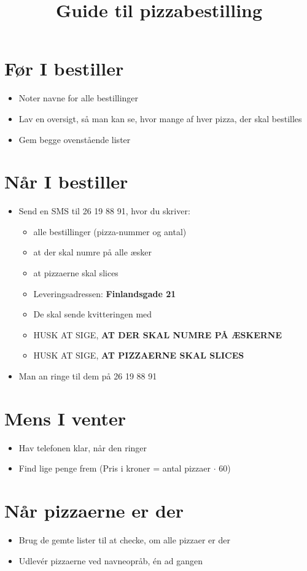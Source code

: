 \documentclass[a4paper,danish]{article}
\title{Guide til pizzabestilling}
\author{}
\date{}
\begin{document}
\maketitle

\section{Før I bestiller}
\begin{itemize}
  \item Noter navne for alle bestillinger
  \item Lav en oversigt, så man kan se, hvor mange af hver pizza, der skal bestilles
    \item Gem begge ovenstående lister
\end{itemize}
\section{Når I bestiller}
\begin{itemize}
  \item Send en SMS til 26 19 88 91, hvor du skriver:
    \begin{itemize}
      \item alle bestillinger (pizza-nummer og antal)
      \item at der skal numre på alle æsker
      \item at pizzaerne skal slices
      \item Leveringsadressen: \textbf{Finlandsgade 21}
      \item De skal sende kvitteringen med
      \item HUSK AT SIGE, \textbf{AT DER SKAL NUMRE PÅ ÆSKERNE}
      \item HUSK AT SIGE, \textbf{AT PIZZAERNE SKAL SLICES}
    \end{itemize}
  \item Man an ringe til dem på 26 19 88 91
\end{itemize}

\section{Mens I venter}
\begin{itemize}
  \item Hav telefonen klar, når den ringer
  \item Find lige penge frem (Pris i kroner = antal pizzaer $\cdot$ 60)
\end{itemize}

\section{Når pizzaerne er der}
\begin{itemize}
  \item Brug de gemte lister til at checke, om alle pizzaer er der
  \item Udlevér pizzaerne ved navneopråb, én ad gangen
\end{itemize}
\end{document}
